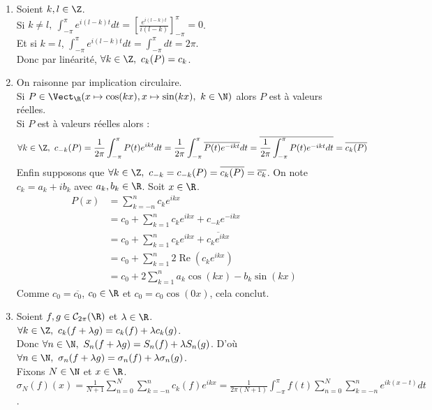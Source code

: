 \documentclass{book}
\begin{document}
\begin{enumerate}[leftmargin=*]
		Donc pour $N$ assez grand, $\forall n\geq N,\ \normep{\infty}{u_n(f)-f}\leq \varepsilon(1-\varepsilon)+c\varepsilon+\normep{\infty}{f}\varepsilon\underset{\varepsilon\to 0}{\longrightarrow} 0$.\\
		i.e $\normep{\infty}{u_n(f)-f}\unfty\longrightarrow 0$.
		\item Soient $k,l\in \Z$.\\
		Si $k\ne l,\ \displaystyle\int_{-\pi}^\pi e^{i(l-k)t}dt=\left[\frac{e^{i(l-k)t}}{i(l-k)}\right]_{-\pi}^\pi=0$.\\
		Et si $k=l$, $\displaystyle\int_{-\pi}^\pi e^{i(l-k)t}dt=\int_{-\pi}^\pi dt=2\pi$.\\
		Donc par linéarité, $\forall k\in \Z,\ c_k(P)=c_k$.
		\item On raisonne par implication circulaire.\\
		Si $P\in \Vect_\R(x\mapsto \cos(kx),x\mapsto \sin(kx),\ k\in \N)$ alors $P$ est à valeurs réelles.\\
		Si $P$ est à valeurs réelles alors :
		$$\forall k\in \Z,\ c_{-k}(P)=\frac{1}{2\pi}\int_{-\pi}^\pi P(t)e^{ikt}dt=\frac{1}{2\pi}\int_{-\pi}^\pi \overline{P(t)e^{-ikt}}dt=\overline{\frac{1}{2\pi}\int_{-\pi}^\pi P(t)e^{-ikt}dt}=\overline{c_k(P)}$$
		Enfin supposons que $\forall k\in \Z,\ c_{-k}=c_{-k}(P)=\overline{c_k(P)}=\overline{c_k}$. On note $c_k=a_k+ib_k$ avec $a_k,b_k\in \R$. Soit $x\in \R$.\\
		\begin{align*}
			P(x)&=\sum_{k=-n}^nc_ke^{ikx}\\
			&=c_0+\sum_{k=1}^nc_ke^{ikx}+c_{-k}e^{-ikx}\\
			&=c_0+\sum_{k=1}^nc_ke^{ikx}+\overline{c_ke^{ikx}}\\
			&=c_0+\sum_{k=1}^n2\operatorname{Re}(c_ke^{ikx})\\
			&=c_0+2\sum_{k=1}^na_k\cos(kx)-b_k\sin(kx)
		\end{align*}
		Comme $c_0=\overline{c_0}$, $c_0\in \R$ et $c_0=c_0\cos(0x)$, cela conclut.
		\item Soient $f,g\in \mathcal C_{2\pi}(\R)$ et $\lambda\in \R$.\\
		$\forall k\in \Z,\ c_k(f+\lambda g)=c_k(f)+\lambda c_k(g)$.\\
		Donc $\forall n\in \N,\ S_n(f+\lambda g)=S_n(f)+\lambda S_n(g)$. D'où $\forall n\in \N,\ \sigma_n(f+\lambda g)=\sigma_n(f)+\lambda \sigma_n(g)$.\\
		Fixons $N\in \N$ et $x\in \R$.\\
		$\sigma_N(f)(x)=\displaystyle\frac{1}{N+1}\sum_{n=0}^N\sum_{k=-n}^nc_k(f)e^{ikx}=\frac{1}{2\pi(N+1)}\int_{-\pi}^\pi f(t)\sum_{n=0}^N\sum_{k=-n}^ne^{ik(x-t)}dt$.\\

\end{enumerate}
\end{document}
